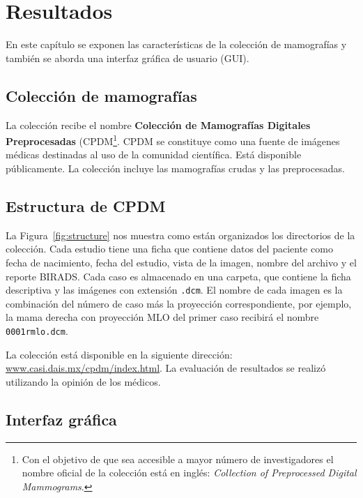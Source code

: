 \chapter{Resultados}
\label{resultados}

En este capítulo se exponen las características de la colección de mamografías y
también se aborda una interfaz gráfica de usuario (GUI).

\section{Colección de mamografías}

La colección recibe el nombre \textbf{Colección de Mamografías Digitales
Preprocesadas} (CPDM\footnote{Con el objetivo de que sea accesible a mayor
número de investigadores el nombre oficial de la colección está en inglés:
\textit{Collection of Preprocessed Digital Mammograms}.}. CPDM se constituye
como una fuente de imágenes médicas destinadas al uso de la comunidad
científica. Está disponible públicamente. La colección incluye las mamografías
crudas y las preprocesadas. 

\section{Estructura de CPDM}

La Figura~\ref{fig:structure} nos muestra como están organizados los
directorios de la colección. Cada estudio tiene una ficha que contiene datos
del paciente como fecha de nacimiento, fecha del estudio, vista de la imagen,
nombre del archivo y el reporte BIRADS. Cada caso es almacenado en una carpeta,
que contiene la ficha descriptiva y las imágenes con extensión \texttt{.dcm}.
El nombre de cada imagen es la combinación del número de caso más la proyección
correspondiente, por ejemplo, la mama derecha con proyección MLO del primer
caso recibirá el nombre \texttt{0001rmlo.dcm}.

La colección está disponible en la siguiente dirección:
\url{www.casi.dais.mx/cpdm/index.html}. La evaluación de resultados se realizó
utilizando la opinión de los médicos.

\shorthandoff{>} %
    
\shorthandon{>} 

\section{Interfaz gráfica}

